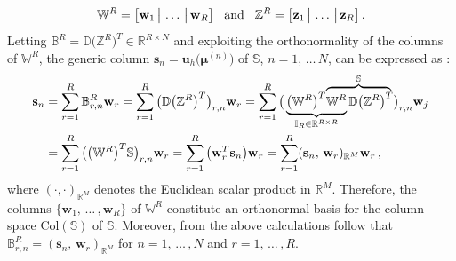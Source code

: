\documentclass[12pt, a4paper, twoside, openright]{report}
\numberwithin{equation}{chapter}
\theoremstyle{theorem}
\theoremstyle{definition}
\theoremstyle{remark}
\theoremstyle{proposition}
\numberwithin{figure}{chapter}
\newcommand{\bg}[1]{\boldsymbol{#1}}
\begin{document}
		\begin{equation}
			\label{eq:svd-compact-matrices}
			\mathbb{W}^R = \big[ \mathbf{w}_1 \, \big| \, \ldots \, \big| \, \mathbf{w}_R \big] \hspace*{0.3cm} \text{and} \hspace*{0.3cm} \mathbb{Z}^R = \big[ \mathbf{z}_1 \, \big| \, \ldots \, \big| \, \mathbf{z}_R \big] \, .
		\end{equation}
		Letting $\mathbb{B}^R = \mathbb{D} \big( \mathbb{Z}^R \big)^T \in \mathbb{R}^{R \times N}$ and exploiting the orthonormality of the columns of $\mathbb{W}^R$, the generic column $\mathbf{s}_n = \mathbf{u}_h \big( \bg{\mu}^{(n)} \big)$ of $\mathbb{S}$, $n = 1, \, \ldots \, N$, can be expressed as \cite{Vol08}:
		\begin{equation*}
			\begin{aligned}
				\mathbf{s}_n & = \sum_{r = 1}^R \mathbb{B}^R_{r,n} \mathbf{w}_r = \sum_{r = 1}^R \big( \mathbb{D} \big( \mathbb{Z}^R \big)^T \big)_{r,n} \mathbf{w}_r = \sum_{r = 1}^R \big( \underbrace{ \big( \mathbb{W}^R \big)^T \lefteqn{\overbrace{\phantom{\mathbb{W}^R \mathbb{D} \big( \mathbb{Z}^R \big)^T}}^{\mathbb{S}}} \mathbb{W}^R}_{\mathbb{I}_R \in \mathbb{R}^{R \times R}} \mathbb{D} \big( \mathbb{Z}^R \big)^T \big)_{r,n} \mathbf{w}_j \\
				& = \sum_{r = 1}^R \big( \big( \mathbb{W}^R \big)^T \mathbb{S} \big)_{r,n} \mathbf{w}_r = \sum_{r = 1}^R \big( \mathbf{w}_r^T \mathbf{s}_n \big) \mathbf{w}_r = \sum_{r = 1}^R (\mathbf{s}_n, \, \mathbf{w}_r)_{\mathbb{R}^M} \mathbf{w}_r \, ,
			\end{aligned}
		\end{equation*}
		where $(\cdot,\cdot)_{\mathbb{R}^M}$ denotes the Euclidean scalar product in $\mathbb{R}^M$. Therefore, the columns $\big\lbrace \mathbf{w}_1, \, \ldots \, , \mathbf{w}_R \big\rbrace$ of $\mathbb{W}^R$ constitute an orthonormal basis for the column space $\text{Col}(\mathbb{S})$ of $\mathbb{S}$. Moreover, from the above calculations follow that $\mathbb{B}^R_{r,n} = (\mathbf{s}_n, \, \mathbf{w}_r)_{\mathbb{R}^M}$ for $n = 1, \, \ldots \, , N$ and $r = 1, \, \ldots \, , R$.
		
\end{document}
